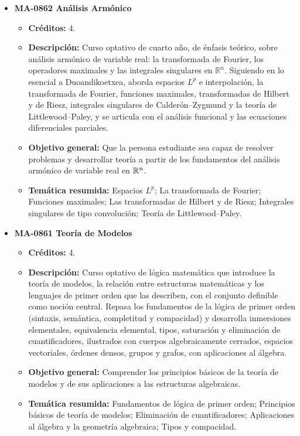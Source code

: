 \begin{itemize}[leftmargin=1.3em, itemsep=10pt, topsep=4pt, label={\color{Azul-UCR}$\blacksquare$}]
\item {\color{Azul-UCR}\textbf{MA-0862 Análisis Armónico}}\par\nopagebreak\smallskip
\begin{itemize}[leftmargin=1.1em, itemsep=3pt, topsep=2pt, parsep=2pt, label={\textendash}]
\item \textbf{Créditos:} 4.
\item \textbf{Descripción:} Curso optativo de cuarto año, de énfasis teórico, sobre análisis armónico de variable real: la transformada de Fourier, los operadores maximales y las integrales singulares en $\mathbb{R}^n$. Siguiendo en lo esencial a Duoandikoetxea, aborda espacios $L^p$ e interpolación, la transformada de Fourier, funciones maximales, transformadas de Hilbert y de Riesz, integrales singulares de Calderón--Zygmund y la teoría de Littlewood--Paley, y se articula con el análisis funcional y las ecuaciones diferenciales parciales.
\item \textbf{Objetivo general:} Que la persona estudiante sea capaz de resolver problemas y desarrollar teoría a partir de los fundamentos del análisis armónico de variable real en $\mathbb{R}^n$.
\item \textbf{Temática resumida:} Espacios $L^p$; La transformada de Fourier; Funciones maximales; Las transformadas de Hilbert y de Riesz; Integrales singulares de tipo convolución; Teoría de Littlewood--Paley.
\end{itemize}

\item {\color{Azul-UCR}\textbf{MA-0861 Teoría de Modelos}}\par\nopagebreak\smallskip
\begin{itemize}[leftmargin=1.1em, itemsep=3pt, topsep=2pt, parsep=2pt, label={\textendash}]
\item \textbf{Créditos:} 4.
\item \textbf{Descripción:} Curso optativo de lógica matemática que introduce la teoría de modelos, la relación entre estructuras matemáticas y los lenguajes de primer orden que las describen, con el conjunto definible como noción central. Repasa los fundamentos de la lógica de primer orden (sintaxis, semántica, completitud y compacidad) y desarrolla inmersiones elementales, equivalencia elemental, tipos, saturación y eliminación de cuantificadores, ilustrados con cuerpos algebraicamente cerrados, espacios vectoriales, órdenes densos, grupos y grafos, con aplicaciones al álgebra.
\item \textbf{Objetivo general:} Comprender los principios básicos de la teoría de modelos y de sus aplicaciones a las estructuras algebraicas.
\item \textbf{Temática resumida:} Fundamentos de lógica de primer orden; Principios básicos de teoría de modelos; Eliminación de cuantificadores; Aplicaciones al álgebra y la geometría algebraica; Tipos y compacidad.
\end{itemize}


\end{itemize}
